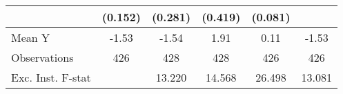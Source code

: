 {\begin{tabular}{l*{5}{c}}
            &     (0.152)         &     (0.281)         &     (0.419)         &     (0.081)         &                     \\
\midrule
Mean Y      &       -1.53         &       -1.54         &        1.91         &        0.11         &       -1.53         \\
Observations&         426         &         428         &         428         &         426         &         426         \\
Exc. Inst. F-stat&                     &      13.220         &      14.568         &      26.498         &      13.081         \\
\bottomrule
\end{tabular}
}
